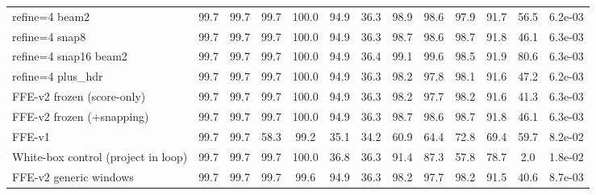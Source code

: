\begin{tabular}{@{}lcccccccccccc@{}}
refine{=}4 beam2 & 99.7 & 99.7 & 99.7 & 100.0 & 94.9 & 36.3 & 98.9 & 98.6 & 97.9 & 91.7 & 56.5 & 6.2e-03 \\
refine{=}4 snap8 & 99.7 & 99.7 & 99.7 & 100.0 & 94.9 & 36.3 & 98.7 & 98.6 & 98.7 & 91.8 & 46.1 & 6.3e-03 \\
refine{=}4 snap16 beam2 & 99.7 & 99.7 & 99.7 & 100.0 & 94.9 & 36.4 & 99.1 & 99.6 & 98.5 & 91.9 & 80.6 & 6.3e-03 \\
refine{=}4 plus\_hdr & 99.7 & 99.7 & 99.7 & 100.0 & 94.9 & 36.3 & 98.2 & 97.8 & 98.1 & 91.6 & 47.2 & 6.2e-03 \\
\midrule
FFE-v2 frozen (score-only) & 99.7 & 99.7 & 99.7 & 100.0 & 94.9 & 36.3 & 98.2 & 97.7 & 98.2 & 91.6 & 41.3 & 6.3e-03 \\
FFE-v2 frozen (+snapping) & 99.7 & 99.7 & 99.7 & 100.0 & 94.9 & 36.3 & 98.7 & 98.6 & 98.7 & 91.8 & 46.1 & 6.3e-03 \\
\midrule
FFE-v1 & 99.7 & 99.7 & 58.3 & 99.2 & 35.1 & 34.2 & 60.9 & 64.4 & 72.8 & 69.4 & 59.7 & 8.2e-02 \\
White-box control (project in loop) & 99.7 & 99.7 & 99.7 & 100.0 & 36.8 & 36.3 & 91.4 & 87.3 & 57.8 & 78.7 & 2.0 & 1.8e-02 \\
FFE-v2 generic windows & 99.7 & 99.7 & 99.7 & 99.6 & 94.9 & 36.3 & 98.2 & 97.7 & 98.2 & 91.5 & 40.6 & 8.7e-03 \\
\bottomrule
\end{tabular}
